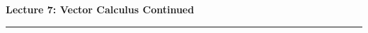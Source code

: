 \documentclass[10pt, twocolumn]{article}
\theoremstyle{definition}
\theoremstyle{plain}
\begin{document}
\noindent
\begin{minipage}{\linewidth}
    \centering
    \textbf{\Large Lecture 7: Vector Calculus Continued} \\[0.5em]
    \hrule
\end{minipage}
\vspace{1em}

\end{document}
